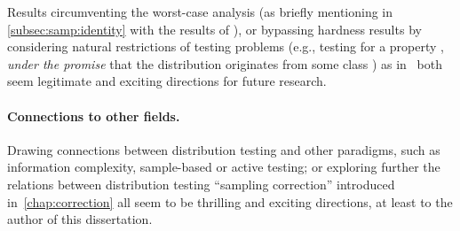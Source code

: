 Results circumventing the worst-case analysis (as briefly mentioning in \autoref{subsec:samp:identity} with the results of \cite{ValiantValiant:14}), or bypassing hardness results by considering natural restrictions of testing problems (e.g., testing for a property \property, \emph{under the promise} that the distribution originates from some class \class) as in~\cite{DDSV:13,DKN:15,DKN:15:FOCS} both seem legitimate and exciting directions for future research.
\paragraph{Connections to other fields.} Drawing connections between distribution testing and other paradigms, such as information complexity, sample-based or active testing; or exploring further the relations between distribution testing ``sampling correction'' introduced in~\cref{chap:correction} all seem to be thrilling and exciting directions, at least to the author of this dissertation.
